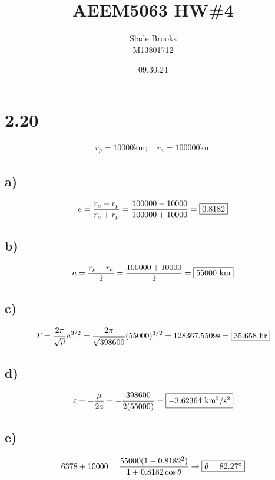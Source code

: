 \documentclass[12 pt]{article}
\title{AEEM5063 HW\#4}
\date{09.30.24}
\author{Slade Brooks \\ M13801712}
\begin{document}
\maketitle

\section*{2.20}
\begin{align*}
    r_p=10000 \textrm{km};\quad r_a=100000 \textrm{km}
\end{align*}

\subsection*{a)}
\begin{align*}
    e = \frac{r_a-r_p}{r_a+r_p}=\frac{100000-10000}{100000+10000}=\fbox{$0.8182$}
\end{align*}

\subsection*{b)}
\begin{align*}
    a=\frac{r_p+r_a}{2}=\frac{100000+10000}{2}=\fbox{$55000$ km}
\end{align*}

\subsection*{c)}
\begin{align*}
    T=\frac{2\pi}{\sqrt{\mu}}a^{3/2}=\frac{2\pi}{\sqrt{398600}}(55000)^{3/2}=128367.5509\textrm{s}
    =\fbox{$35.658$ hr}
\end{align*}

\subsection*{d)}
\begin{align*}
    \varepsilon = -\frac{\mu}{2a}=-\frac{398600}{2(55000)}=\fbox{$-3.62364$ km$^2$/s$^2$}
\end{align*}

\subsection*{e)}
\begin{align*}
    6378 + 10000=\frac{55000(1-0.8182^2)}{1+0.8182\cos{\theta}} \rightarrow \fbox{$\theta=82.27^\circ$}
\end{align*}
\end{document}
